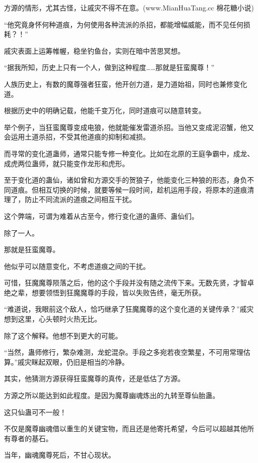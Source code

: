 
\begin{this_body}

方源的情形，尤其古怪，让戚灾不得不在意。(www.MianHuaTang.cc 棉花糖小说)

“他究竟身怀何种道痕，为何使用各种流派的杀招，都能增幅威能，而不见任何损耗？！”

戚灾表面上运筹帷幄，稳坐钓鱼台，实则在暗中苦思冥想。

“据我所知，历史上只有一个人，做到这种程度……那就是狂蛮魔尊！”

人族历史上，有数的魔尊强者狂蛮，他开创力道，是力道始祖，同时也兼修变化道。

根据历史中的明确记载，他能千变万化，同时道痕可以随意转变。

举个例子，当狂蛮魔尊变成电狼，他就能催发雷道杀招。当他又变成泥沼蟹，他又会运用土道杀招，不受其他道痕的抑制和减损。

而寻常的变化道蛊师，通常只能专修一种变化。比如在北原的王庭争霸中，成龙、成虎两位蛊师，就只能变作龙形和虎形。

至于变化道的蛊仙，诸如曾和方源交手的贺狼子，他能变化三种狼的形态，身负不同道痕。但相互切换的时候，就要等候一段时间，趁机运用手段，将原本的道痕清理了，防止不同流派的道痕之间相互干扰。

这个弊端，可谓为难着从古至今，修行变化道的蛊师、蛊仙们。

除了一人。

那就是狂蛮魔尊。

他似乎可以随意变化，不考虑道痕之间的干扰。

可惜，狂魔魔尊陨落之后，他的这个手段并没有随之流传下来。无数先贤，才智卓绝之辈，想要领悟到狂魔魔尊的手段，皆以失败告终，毫无所获。

“难道说，我眼前这个敌人，恰巧继承了狂魔魔尊的这个变化道的关键传承？”戚灾想到这里，心头顿时火热无比。

除了这个解释。他想不到更大的可能。

“当然，蛊师修行，繁杂难测，龙蛇混杂。手段之多宛若夜空繁星，不可用常理估算。”戚灾眯起双眼，仍旧是相当的冷静。

其实，他猜测方源获得狂蛮魔尊的真传，还是低估了方源。

方源之所以能达到如此程度。是因为魔尊幽魂炼出的九转至尊仙胎蛊。

这只仙蛊可不一般！

不仅是魔尊幽魂借以重生的关键宝物，而且还是他寄托希望，今后可以超越其他所有尊者的基石。

当年，幽魂魔尊死后，不甘心现状。


\end{this_body}
